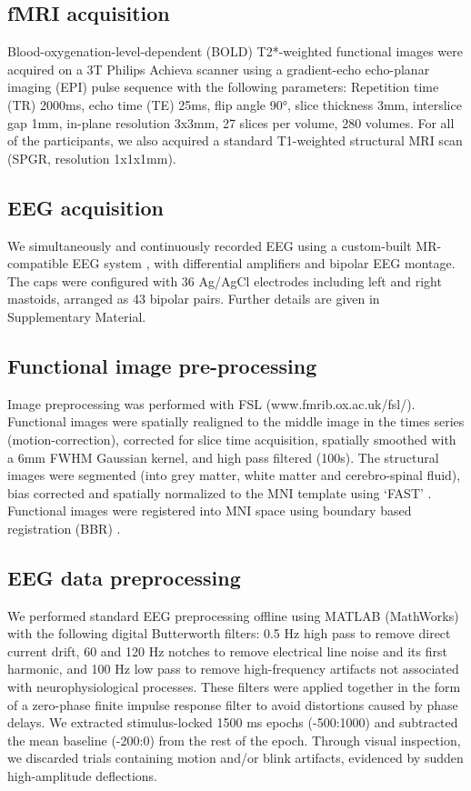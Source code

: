 \subsection*{fMRI acquisition}
Blood-oxygenation-level-dependent (BOLD) T2*-weighted functional images were acquired on a 3T Philips Achieva scanner using a gradient-echo echo-planar imaging (EPI) pulse sequence with the following parameters: Repetition time (TR) 2000ms, echo time (TE) 25ms, flip angle 90°, slice thickness 3mm, interslice gap 1mm, in-plane resolution 3x3mm, 27 slices per volume, 280 volumes. For all of the participants, we also acquired a standard T1-weighted structural MRI scan (SPGR, resolution 1x1x1mm). 

\subsection*{EEG acquisition}
We simultaneously and continuously recorded EEG using a custom-built MR-compatible EEG system \cite{Sajda2007,Sajda2010a}, with differential amplifiers and bipolar EEG montage. The caps were configured with 36 Ag/AgCl electrodes including left and right mastoids, arranged as 43 bipolar pairs. Further details are given in Supplementary Material. 

\subsection*{Functional image pre-processing}
Image preprocessing was performed with FSL (www.fmrib.ox.ac.uk/fsl/). Functional images were spatially realigned to the middle image in the times series (motion-correction), corrected for slice time acquisition, spatially smoothed with a 6mm FWHM Gaussian kernel, and high pass filtered (100s). The structural images were segmented (into grey matter, white matter and cerebro-spinal fluid), bias corrected and spatially normalized to the MNI template using ‘FAST’ \cite{Zhang2001a}. Functional images were registered into MNI space using boundary based registration (BBR) \cite{Greve2009}.

\subsection*{EEG data preprocessing}
We performed standard EEG preprocessing offline using MATLAB (MathWorks) with the following digital Butterworth filters: 0.5 Hz high pass to remove direct current drift, 60 and 120 Hz notches to remove electrical line noise and its first harmonic, and 100 Hz low pass to remove high-frequency artifacts not associated with neurophysiological processes. These filters were applied together in the form of a zero-phase finite impulse response filter to avoid distortions caused by phase delays. We extracted stimulus-locked 1500 ms epochs (-500:1000) and subtracted the mean baseline (-200:0) from the rest of the epoch. Through visual inspection, we discarded trials containing motion and/or blink artifacts, evidenced by sudden high-amplitude deflections.

